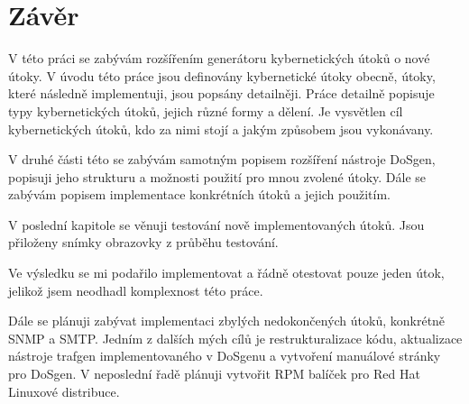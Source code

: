 \chapter{Závěr}
V této práci se zabývám rozšířením generátoru kybernetických útoků o nové útoky. V úvodu této práce jsou definovány kybernetické útoky obecně, útoky, které následně implementuji, jsou popsány detailněji. Práce detailně popisuje typy kybernetických útoků, jejich různé formy a dělení. Je vysvětlen cíl kybernetických útoků, kdo za nimi stojí a jakým způsobem jsou vykonávany.

V druhé části této se zabývám samotným popisem rozšíření nástroje DoSgen, popisuji jeho strukturu a možnosti použití pro mnou zvolené útoky. Dále se zabývám popisem implementace konkrétních útoků a jejich použitím.

V poslední kapitole se věnuji testování nově implementovaných útoků. Jsou přiloženy snímky obrazovky z průběhu testování.

Ve výsledku se mi podařilo implementovat a řádně otestovat pouze jeden útok, jelikož jsem neodhadl komplexnost této práce.

Dále se plánuji zabývat implementaci zbylých nedokončených útoků, konkrétně SNMP a SMTP. Jedním z dalších mých cílů je restrukturalizace kódu, aktualizace nástroje trafgen implementovaného v DoSgenu a vytvoření manuálové stránky pro DoSgen. V neposlední řadě plánuji vytvořit RPM balíček pro Red Hat Linuxové distribuce.